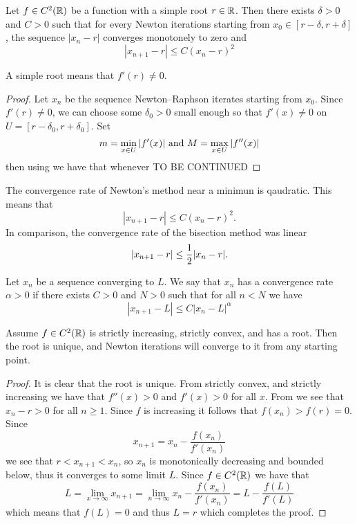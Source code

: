 \documentclass[11pt,a4paper]{article}
\begin{document}
\begin{proposition}
  Let $f \in C^2(\mathbb{R})$ be a function with a simple root $r \in \mathbb{R}$.
  Then there exists $\delta > 0$ and $C > 0$ such that for every Newton
  iterations starting from $x_0 \in [r - \delta, r + \delta]$, the
  sequence $|x_n - r|$ converges monotonely to zero and
  \[
    |x_{n  + 1} - r| \le C(x_n - r)^2
  \]
\end{proposition}
\begin{remark}
  A simple root means that $f'(r) \neq 0$.
\end{remark}
\begin{proof}
  Let $x_n$ be the sequence Newton--Raphson iterates starting from $x_0$.
  Since $f'(r) \neq 0$, we can choose some $\delta_0 > 0$ small enough so
  that $f'(x) \neq 0$ on $U = [r - \delta_0, r + \delta_0]$.
  Set
  \[
    m = \min_{x \in U} |f'(x)| \text{ and } M = \max_{x \in U} |f''(x)|
  \]
  then using  we have that whenever 
  TO BE CONTINUED
\end{proof}

The convergence rate of Newton's method near a minimun is qaudratic.
This means that
\[
  |x_{n + 1} - r| \le C (x_n - r)^2.
\]
In comparison, the convergence rate of the bisection method was linear
\[
  |x_{n + 1} - r| \le \frac{1}{2} |x_n - r|.
\]

\begin{definition}
  Let $x_n$ be a sequence converging to $L$.
  We say that $x_n$ has a convergence rate $\alpha > 0$ if there exists
  $C > 0$ and $N > 0$ such that for all $n < N$ we have
  \[
    |x_{n + 1} - L| \le C |x_n - L|^{\alpha}
  \]
\end{definition}

\begin{theorem}
  Assume $f \in C^2(\mathbb{R})$ is strictly increasing, strictly convex, 
  and has a root.
  Then the root is unique, and Newton iterations will converge to it from
  any starting point.
\end{theorem}
\begin{proof}
  It is clear that the root is unique.
  From strictly convex, and strictly increasing we have that
  $f''(x) > 0$ and $f'(x) > 0$ for all $x$.
  From  we see that $x_n - r > 0$ for all $n \geq 1$.
  Since $f$ is increasing it follows that $f(x_n) > f(r) = 0$.
  Since
  \[
    x_{n + 1} = x_n - \frac{f(x_n)}{f'(x_n)}
  \]
  we see that $r < x_{n + 1} < x_n$, so $x_n$ is monotonically decreasing and
  bounded below, thus it converges to some limit $L$.
  Since $f \in C^2(\mathbb{R})$ we have that
  \[
    L = 
    \lim_{x \to \infty} x_{n + 1} =
    \lim_{n \to \infty} x_n - \frac{f(x_n)}{f'(x_n)} =
    L - \frac{f(L)}{f'(L)}
  \]
  which means that $f(L) = 0$ and thus $L = r$ which completes the proof.
\end{proof}
\end{document}
